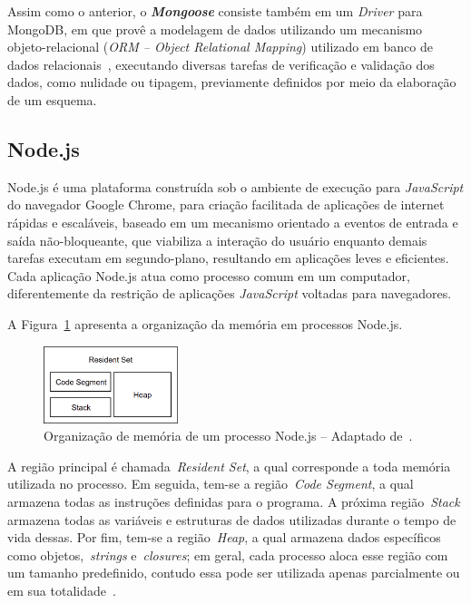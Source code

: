 \documentclass[12pt]{article}
\begin{document}
Assim como o anterior, o \textbf{\textit{Mongoose}} consiste também em um \emph{Driver} para MongoDB, em que provê a modelagem de dados utilizando um mecanismo objeto-relacional (\emph{ORM -- Object Relational Mapping}) utilizado em banco de dados relacionais~\cite{mardan2014boosting}, executando diversas tarefas de verificação e validação dos dados, como nulidade ou tipagem, previamente definidos por meio da elaboração de um esquema.

\subsection{Node.js}
\label{subsection:nodejs}

Node.js é uma plataforma construída sob o ambiente de execução para \textit{JavaScript} do navegador Google Chrome, para criação facilitada de aplicações de internet rápidas e escaláveis, baseado em um mecanismo orientado a eventos de entrada e saída não-bloqueante, que viabiliza a interação do usuário enquanto demais tarefas executam em segundo-plano, resultando em aplicações leves e eficientes.
Cada aplicação Node.js atua como processo comum em um computador, diferentemente da restrição de aplicações \textit{JavaScript} voltadas para navegadores. 

A Figura~\ref{figure:memoria} apresenta a organização da memória em processos Node.js.

\begin{figure}[!h]
    \centering
    \includegraphics[width=0.35\textwidth]{images/set}
    \caption{Organização de memória de um processo Node.js -- Adaptado de~\cite{nodememory}.}
    \label{figure:memoria}
\end{figure} 

A região principal é chamada~\emph{Resident Set}, a qual corresponde a toda memória utilizada no processo. Em seguida, tem-se a região~\emph{Code Segment}, a qual armazena todas as instruções definidas para o programa. A próxima região~\emph{Stack} armazena todas as variáveis e estruturas de dados utilizadas durante o tempo de vida dessas. 
Por fim, tem-se a região~\emph{Heap}, a qual armazena dados específicos como objetos,~\emph{strings} e~\emph{closures}; em geral, cada processo aloca esse região com um tamanho predefinido, contudo essa pode ser utilizada apenas parcialmente ou em sua totalidade~\cite{nodememory}. 
\end{document}
